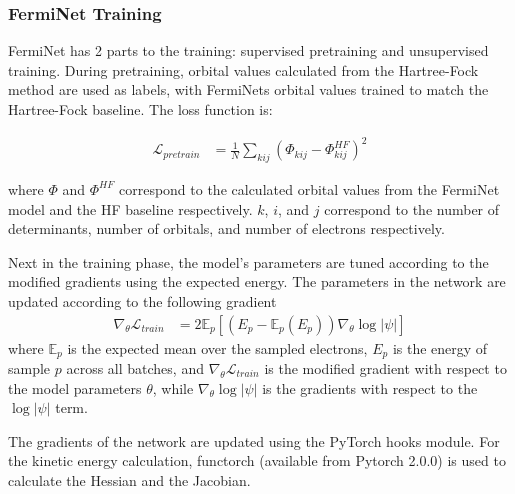 \documentclass[letterpaper]{article} %
\begin{document}
\subsubsection{FermiNet Training}
FermiNet has 2 parts to the training: supervised pretraining and unsupervised training.  
During pretraining, orbital values calculated from the Hartree-Fock method are used as labels, with FermiNets orbital values trained to match the Hartree-Fock baseline. The loss function is:

\begin{align}
\mathcal{L}_{pretrain} &= \frac{1}{N} \sum_{kij}^{} \left( \Phi_{kij} - {\Phi_{kij}^{HF   }} \right)^{2}
\end{align}

\noindent where \(\Phi\) and \({\Phi_{}^{HF}}\) correspond to the calculated orbital values from the FermiNet model and the HF baseline respectively. $k$, $i$, and $j$ correspond to the number of determinants, number of orbitals, and number of electrons respectively.

Next in the training phase, the model's parameters are tuned according to the modified gradients using the expected energy. The parameters in the network are updated according to the following gradient
\begin{align}
\nabla_{\theta}\mathcal{L}_{train} &= 2\mathbb{E}_p \left[ \left( E_p - \mathbb{E}_p(E_p) \right)\nabla_{\theta}\log |\psi| \right]
\end{align}
\noindent where $\mathbb{E}_p$ is the expected mean over the sampled electrons, $E_p$ is the energy of sample $p$ across all batches, and \(\nabla_{\theta}\mathcal{L}_{train}\) is the modified gradient with respect to the model parameters \(\theta\), while \(\nabla_{\theta}\log |\psi|\) is the gradients with respect to the \(\log |\psi|\) term.

The gradients of the network are updated using the PyTorch hooks module. For the kinetic energy calculation, functorch \cite{functorch2021} (available from Pytorch 2.0.0) is used to calculate the Hessian and the Jacobian. 
\end{document}
